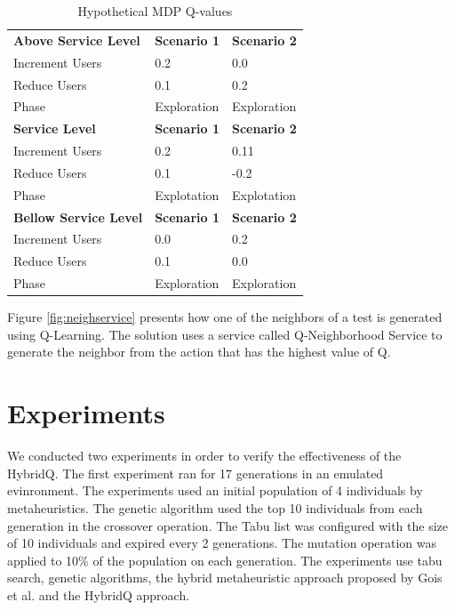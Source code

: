 \documentclass{bmcart}
\begin{document}
\begin{table}[]
\centering
\caption{Hypothetical MDP Q-values }
\label{pab:mdp}
\begin{tabular}{lll}
\rowcolor[HTML]{C0C0C0} 
\textbf{Above Service Level}  & \textbf{Scenario 1} & \textbf{Scenario 2} \\
Increment Users               & 0.2                 & 0.0                 \\
Reduce Users                  & 0.1                 & 0.2                 \\
Phase                         & Exploration         & Exploration         \\
\rowcolor[HTML]{C0C0C0} 
\textbf{Service Level}        & \textbf{Scenario 1} & \textbf{Scenario 2} \\
Increment Users               & 0.2                 & 0.11                \\
Reduce Users                  & 0.1                 & -0.2                \\
\rowcolor[HTML]{F8FF00} 
Phase                         & Explotation         & Explotation         \\
\rowcolor[HTML]{C0C0C0} 
\textbf{Bellow Service Level} & \textbf{Scenario 1} & \textbf{Scenario 2} \\
Increment Users               & 0.0                 & 0.2                 \\
Reduce Users                  & 0.1                 & 0.0                 \\
Phase                         & Exploration         & Exploration        
\end{tabular}
\end{table}

Figure \ref{fig:neighservice} presents how one of the neighbors of a test is generated using Q-Learning. The solution uses a service called Q-Neighborhood Service to generate the neighbor from the action that has the highest value of Q.



\section{Experiments}

We conducted two experiments in order to verify the effectiveness of the HybridQ. The first experiment ran for 17 generations in an emulated evinronment. The experiments used an initial population of 4 individuals by metaheuristics. The genetic algorithm used the top 10 individuals from each generation in the crossover operation. The Tabu list was configured with the size of 10 individuals and expired every 2 generations.  The mutation operation was applied to 10\% of the population on each generation. The experiments use tabu search, genetic algorithms, the hybrid metaheuristic approach proposed by Gois et al. \citep{Gois2016} and the HybridQ approach. 
\end{document}

